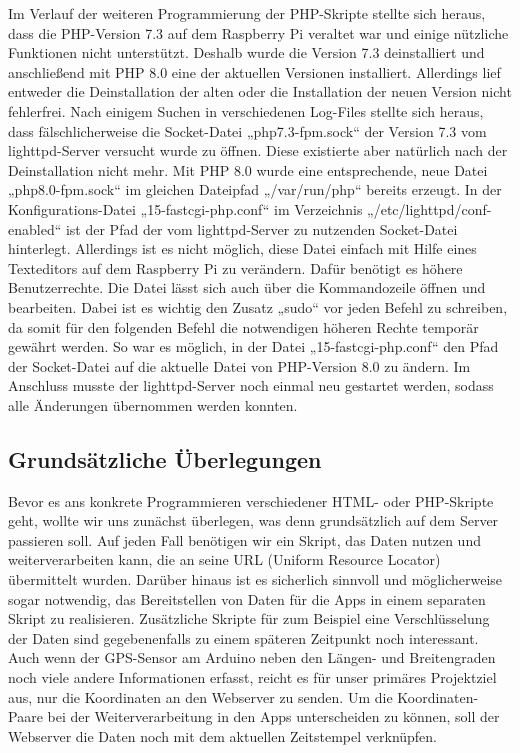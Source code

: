 Im Verlauf der weiteren Programmierung der PHP-Skripte stellte sich heraus, dass die PHP-Version 7.3 auf dem Raspberry Pi veraltet war und einige nützliche Funktionen nicht unterstützt. Deshalb wurde die Version 7.3 deinstalliert und anschließend mit PHP 8.0 eine der aktuellen Versionen installiert. Allerdings lief entweder die Deinstallation der alten oder die Installation der neuen Version nicht fehlerfrei. Nach einigem Suchen in verschiedenen Log-Files stellte sich heraus, dass fälschlicherweise die Socket-Datei „php7.3-fpm.sock“ der Version 7.3 vom lighttpd-Server versucht wurde zu öffnen. Diese existierte aber natürlich nach der Deinstallation nicht mehr. Mit PHP 8.0 wurde eine entsprechende, neue Datei „php8.0-fpm.sock“ im gleichen Dateipfad „/var/run/php“ bereits erzeugt. In der Konfigurations-Datei „15-fastcgi-php.conf“ im Verzeichnis „/etc/lighttpd/conf-enabled“ ist der Pfad der vom lighttpd-Server zu nutzenden Socket-Datei hinterlegt. Allerdings ist es nicht möglich, diese Datei einfach mit Hilfe eines Texteditors auf dem Raspberry Pi zu verändern. Dafür benötigt es höhere Benutzerrechte. Die Datei lässt sich auch über die Kommandozeile öffnen und bearbeiten. Dabei ist es wichtig den Zusatz „sudo“ vor jeden Befehl zu schreiben, da somit für den folgenden Befehl die notwendigen höheren Rechte temporär gewährt werden. So war es möglich, in der Datei „15-fastcgi-php.conf“ den Pfad der Socket-Datei auf die aktuelle Datei von PHP-Version 8.0 zu ändern. Im Anschluss musste der lighttpd-Server noch einmal neu gestartet werden, sodass alle Änderungen übernommen werden konnten.

\subsection{Grundsätzliche Überlegungen}
Bevor es ans konkrete Programmieren verschiedener HTML- oder PHP-Skripte geht, wollte wir uns zunächst überlegen, was denn grundsätzlich auf dem Server passieren soll. Auf jeden Fall benötigen wir ein Skript, das Daten nutzen und weiterverarbeiten kann, die an seine URL (Uniform Resource Locator) übermittelt wurden. Darüber hinaus ist es sicherlich sinnvoll und möglicherweise sogar notwendig, das Bereitstellen von Daten für die Apps in einem separaten Skript zu realisieren. Zusätzliche Skripte für zum Beispiel eine Verschlüsselung der Daten sind gegebenenfalls zu einem späteren Zeitpunkt noch interessant.
Auch wenn der GPS-Sensor am Arduino neben den Längen- und Breitengraden noch viele andere Informationen erfasst, reicht es für unser primäres Projektziel aus, nur die Koordinaten an den Webserver zu senden. Um die Koordinaten-Paare bei der Weiterverarbeitung in den Apps unterscheiden zu können, soll der Webserver die Daten noch mit dem aktuellen Zeitstempel verknüpfen.

